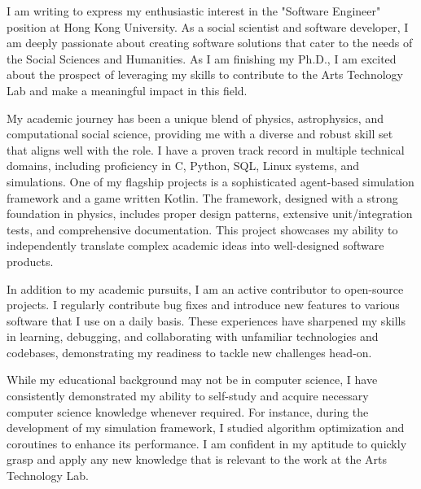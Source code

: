 \documentclass[11pt, a4paper]{awesome-cv}
\begin{document}
\makecvheader[R]

\makecvfooter
  {}%
  {}%
  {}

\makelettertitle

\begin{cvletter}

I am writing to express my enthusiastic interest in the "Software Engineer" position at Hong Kong University. As a social scientist and software developer, I am deeply passionate about creating software solutions that cater to the needs of the Social Sciences and Humanities. As I am finishing my Ph.D., I am excited about the prospect of leveraging my skills to contribute to the Arts Technology Lab and make a meaningful impact in this field.

My academic journey has been a unique blend of physics, astrophysics, and computational social science, providing me with a diverse and robust skill set that aligns well with the role. I have a proven track record in multiple technical domains, including proficiency in C, Python, SQL, Linux systems, and simulations. One of my flagship projects is a sophisticated agent-based simulation framework and a game written Kotlin. The framework, designed with a strong foundation in physics, includes proper design patterns, extensive unit/integration tests, and comprehensive documentation. This project showcases my ability to independently translate complex academic ideas into well-designed software products.

In addition to my academic pursuits, I am an active contributor to open-source projects. I regularly contribute bug fixes and introduce new features to various software that I use on a daily basis. These experiences have sharpened my skills in learning, debugging, and collaborating with unfamiliar technologies and codebases, demonstrating my readiness to tackle new challenges head-on.

While my educational background may not be in computer science, I have consistently demonstrated my ability to self-study and acquire necessary computer science knowledge whenever required. For instance, during the development of my simulation framework, I studied algorithm optimization and coroutines to enhance its performance. I am confident in my aptitude to quickly grasp and apply any new knowledge that is relevant to the work at the Arts Technology Lab.


\end{cvletter}
\end{document}
